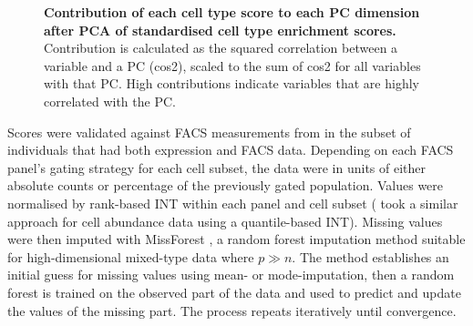 \begin{figure}
\begin{subfigure}[b]{0.65\textwidth}
    \end{subfigure}
    \caption{
        \textbf{
            Contribution of each cell type score to each \gls{PC} dimension after \gls{PCA} of standardised  cell type enrichment scores. 
        }
        Contribution is calculated as the squared correlation between a variable and a \gls{PC} (cos2), 
        scaled to the sum of cos2 for all variables with that \gls{PC}.
        High contributions indicate variables that are highly correlated with the \gls{PC}.
    }
    \label{fig:hird_xCell_cos2}
\end{figure}

Scores were validated against \gls{FACS} measurements from \textcite{sobolev2016AdjuvantedInfluenzaH1N1Vaccination} in the subset of  individuals that had both expression and \gls{FACS} data.
Depending on each \gls{FACS} panel's gating strategy for each cell subset, the data were in units of either absolute counts or percentage of the previously gated population.
Values were normalised by rank-based \gls{INT} within each panel and cell subset (\textcite{astle2016AllelicLandscapeHuman} took a similar approach for cell abundance data using a quantile-based \gls{INT}).
%
Missing values were then imputed with MissForest \autocite{stekhoven2012MissForestNonparametricMissing}, a random forest imputation method suitable for high-dimensional mixed-type data where $p \gg n$.
The method establishes an initial guess for missing values using mean- or mode-imputation, then a random forest is trained on the observed part of the data and used to predict and update the values of the missing part.
The process repeats iteratively until convergence.

